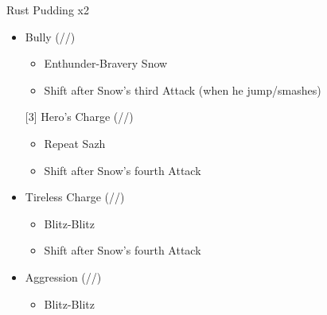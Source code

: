 \renewcommand{\first}{[1] }
\renewcommand{\second}{[2] Devastation (\com/\sab/\com)}
\renewcommand{\third}{[3] Hero's Charge (\syn/\med/\com)}
\renewcommand{\fourth}{[4] Tireless Charge (\com/\med/\com)}
\renewcommand{\fifth}{[5] Bully (\syn/\sab/\com)}
\renewcommand{\sixth}{[6] Aggression (\com/\rav/\com)}
	\begin{battle}[0:24]{Rust Pudding x2}
		\begin{itemize}
			\item \fifth
			      \begin{itemize}
				      \item Enthunder-Bravery Snow
				      \item Shift after Snow's third Attack (when he jump/smashes)
			      \end{itemize}
			      \third
			      \begin{itemize}
				      \item Repeat Sazh
				      \item Shift after Snow's fourth Attack
			      \end{itemize}
			\item \fourth
			      \begin{itemize}
				      \item Blitz-Blitz
				      \item Shift after Snow's fourth Attack
			      \end{itemize}
			\item \sixth
			      \begin{itemize}
				      \item Blitz-Blitz
			      \end{itemize}
		\end{itemize}
	\end{battle}
	\vfill
